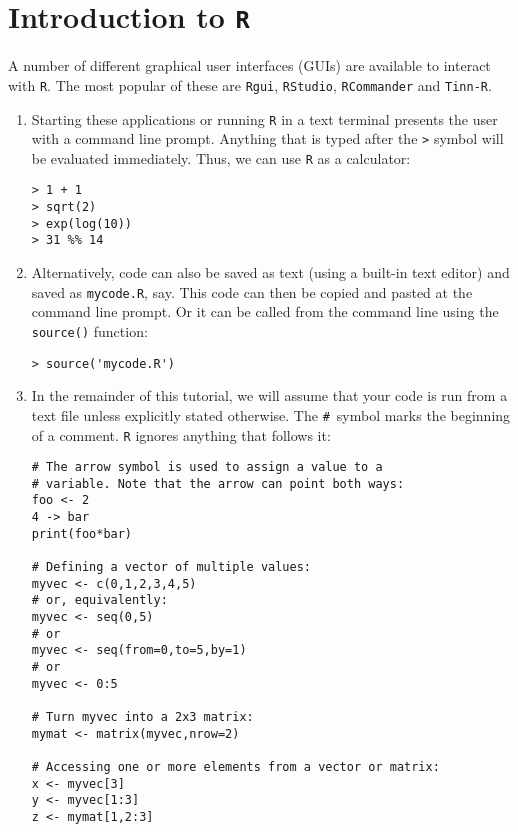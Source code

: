 \section{Introduction to \texttt{R}}
\label{sec:R}

A number of different graphical user interfaces (GUIs) are available
to interact with \texttt{R}. The most popular of these are
\texttt{Rgui}, \texttt{RStudio}, \texttt{RCommander} and
\texttt{Tinn-R}.

\begin{enumerate}
  \item Starting these applications or running \texttt{R} in a text
    terminal presents the user with a command line prompt. Anything
    that is typed after the \texttt{>} symbol will be evaluated
    immediately. Thus, we can use \texttt{R} as a calculator:

\begin{verbatim}
> 1 + 1
> sqrt(2)
> exp(log(10))
> 31 %% 14
\end{verbatim}

\item Alternatively, code can also be saved as text (using a built-in text
  editor) and saved as \texttt{mycode.R}, say. This code can then be
  copied and pasted at the command line prompt. Or it can be called from
  the command line using the \texttt{source()} function:

\begin{verbatim}
> source('mycode.R')
\end{verbatim}

\item In the remainder of this tutorial, we will assume that your code is
  run from a text file unless explicitly stated otherwise. The
  \texttt{\#}~symbol marks the beginning of a comment.  \texttt{R}
  ignores anything that follows it:

\begin{verbatim}
# The arrow symbol is used to assign a value to a
# variable. Note that the arrow can point both ways:
foo <- 2
4 -> bar
print(foo*bar)

# Defining a vector of multiple values:
myvec <- c(0,1,2,3,4,5)
# or, equivalently:
myvec <- seq(0,5)
# or
myvec <- seq(from=0,to=5,by=1)
# or
myvec <- 0:5

# Turn myvec into a 2x3 matrix:
mymat <- matrix(myvec,nrow=2)

# Accessing one or more elements from a vector or matrix:
x <- myvec[3]
y <- myvec[1:3]
z <- mymat[1,2:3]


\end{verbatim}
\end{enumerate}
